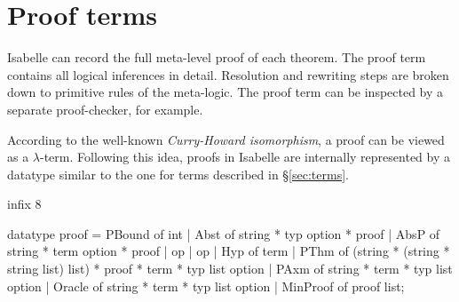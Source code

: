 \section{Proof terms}\label{sec:proofObjects}
 Isabelle can record the full meta-level proof of each
theorem.  The proof term contains all logical inferences in detail.
Resolution and rewriting steps are broken down to primitive rules of the
meta-logic. The proof term can be inspected by a separate proof-checker,
for example.

According to the well-known {\em Curry-Howard isomorphism}, a proof can
be viewed as a $\lambda$-term. Following this idea, proofs
in Isabelle are internally represented by a datatype similar to the one for
terms described in \S\ref{sec:terms}.
\begin{ttbox}
infix 8 %

datatype proof =
   PBound of int
 | Abst of string * typ option * proof
 | AbsP of string * term option * proof
 | op %
 | op %
 | Hyp of term
 | PThm of (string * (string * string list) list) *
           proof * term * typ list option
 | PAxm of string * term * typ list option
 | Oracle of string * term * typ list option
 | MinProof of proof list;
\end{ttbox}


